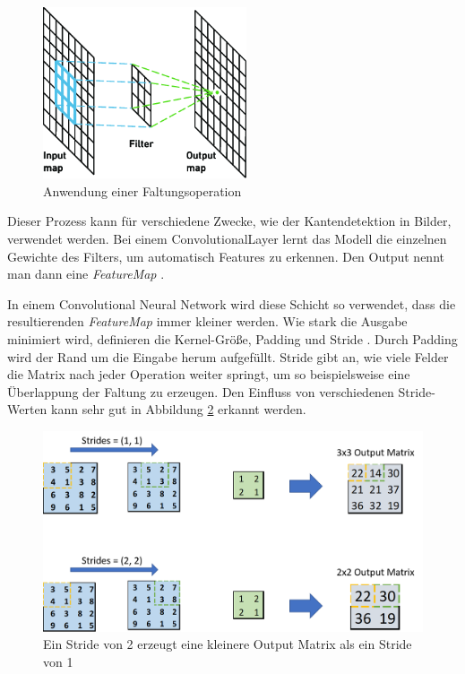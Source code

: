 \begin{figure}[H]
	\centering
	\includegraphics[width=6cm]{kapitel/2_stand_der_technik/img/convolutional_layer.png}
	\caption[Anwendung einer Faltungsoperation]{Anwendung einer Faltungsoperation \cite{convolutional-malware}}
	\label{img:convelutional_layer}
\end{figure}


Dieser Prozess kann für verschiedene Zwecke, wie der Kantendetektion in Bilder, verwendet werden.
Bei einem ConvolutionalLayer lernt das Modell die einzelnen Gewichte des Filters, um automatisch Features zu erkennen.
Den Output nennt man dann eine \textit{FeatureMap} \cite{convolutional_tut}.
\newline

In einem Convolutional Neural Network wird diese Schicht so verwendet, dass die resultierenden \textit{FeatureMap} immer kleiner werden.
Wie stark die Ausgabe minimiert wird, definieren die Kernel-Größe, Padding und Stride \cite{padding_stride}.
Durch Padding wird der Rand um die Eingabe herum aufgefüllt.
Stride gibt an, wie viele Felder die Matrix nach jeder Operation weiter springt, um so beispielsweise eine Überlappung der Faltung zu erzeugen.
Den Einfluss von verschiedenen Stride-Werten kann sehr gut in Abbildung \ref{img:convelutional_stride} erkannt werden.

\begin{figure}[H]
	\centering
	\includegraphics[width=12cm]{kapitel/2_stand_der_technik/img/stride.png}
	\caption[Ein Stride von 2 erzeugt eine kleinere Output Matrix als ein Stride von 1]{Ein Stride von 2 erzeugt eine kleinere Output Matrix als ein Stride von 1 \cite{convolutional_transpose}}
	\label{img:convelutional_stride}
\end{figure}

